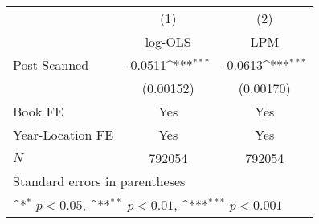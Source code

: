 {
\def\sym#1{\ifmmode^{#1}\else\(^{#1}\)\fi}
\begin{tabular}{l*{2}{c}}
\hline\hline
            &\multicolumn{1}{c}{(1)}&\multicolumn{1}{c}{(2)}\\
            &\multicolumn{1}{c}{log-OLS}&\multicolumn{1}{c}{LPM}\\
\hline
Post-Scanned&     -0.0511\sym{***}&     -0.0613\sym{***}\\
            &   (0.00152)         &   (0.00170)         \\
\hline
Book FE     &         Yes         &         Yes         \\
Year-Location FE&         Yes         &         Yes         \\
\(N\)       &      792054         &      792054         \\
\hline\hline
\multicolumn{3}{l}{\footnotesize Standard errors in parentheses}\\
\multicolumn{3}{l}{\footnotesize \sym{*} \(p<0.05\), \sym{**} \(p<0.01\), \sym{***} \(p<0.001\)}\\
\end{tabular}
}
